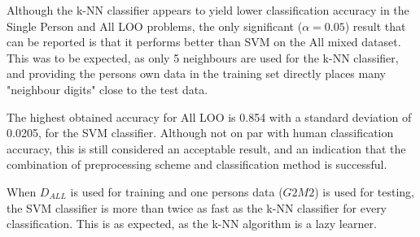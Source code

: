 Although the k-NN classifier appears to yield
lower classification accuracy in the Single Person and All LOO problems,
the only significant (\(\alpha=0.05\)) result
that can be reported is that it performs better
than SVM on the All mixed dataset.
This was to be expected, as only 5 neighbours are used for the
k-NN classifier, and providing the persons
own data in the training set directly places
many "neighbour digits" close to the test data.

The highest obtained accuracy for All LOO is 0.854 with a standard
deviation of 0.0205, for the SVM classifier.
Although not on par with human classification accuracy,
this is still considered an acceptable result,
and an indication that the combination
of preprocessing scheme and classification method
is successful.

When \(D_{ALL}\) is used for training and one persons data (\(G2M2\)) is used
for testing,
the SVM classifier is more than twice as fast as the k-NN classifier
for every classification.
This is as expected, as the k-NN algorithm is a lazy learner.